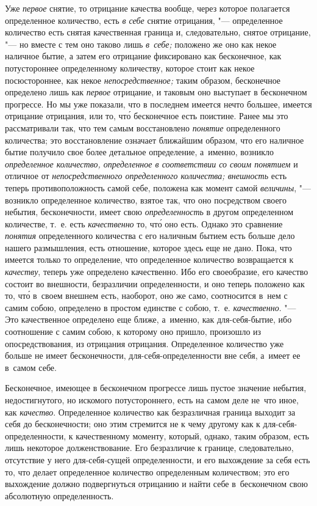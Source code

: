 Уже {\em первое} снятие, то отрицание качества вообще, через которое полагается
определенное количество, есть {\em в себе} снятие отрицания, "--- определенное
количество есть снятая качественная граница и, следовательно, снятое отрицание,
"--- но вместе с тем оно таково лишь {\em в~себе;} положено же оно как некое
наличное бытие, а затем его отрицание фиксировано как бесконечное, как
потустороннее определенному количеству, которое стоит как некое посюстороннее,
как некое {\em непосредственное;} таким образом, бесконечное определено лишь
как {\em первое} отрицание, и таковым оно выступает в бесконечном прогрессе.
Но мы уже показали, что в последнем имеется нечто большее, имеется отрицание
отрицания, или то, чт\'{о} бесконечное есть поистине. Ранее мы это
рассматривали так, что тем самым восстановлено {\em понятие} определенного
количества; это восстановление означает ближайшим образом, что его наличное
бытие получило свое более детальное определение, а~именно, возникло
{\em определенное количество, определенное в соответствии со своим понятием}
и отличное от {\em непосредственного определенного количества; внешность} есть
теперь противоположность самой себе, положена как момент самой {\em величины},
"--- возникло определенное количество, взятое так, что оно посредством своего
небытия, бесконечности, имеет свою {\em определенность} в другом определенном
количестве, т.~е. есть {\em качественно} то, чт\'{о} оно есть. Однако это
сравнение {\em понятия} определенного количества с его наличным бытием есть
больше дело нашего размышления, есть отношение, которое здесь еще не дано.
Пока, что имеется только то определение, что определенное количество
возвращается к {\em качеству}, теперь уже определено качественно. Ибо его
своеобразие, его качество состоит во внешности, безразличии определенности,
и оно теперь положено как то, чт\'{о} в~своем внешнем есть, наоборот, оно же
само, соотносится в~нем с самим собою, определено в простом единстве с собою,
т.~е. {\em качественно}. "--- Это качественное определено еще ближе, а~именно,
как для-себя-бытие, ибо соотношение с самим собою, к которому оно пришло,
произошло из опосредствования, из отрицания отрицания. Определенное количество
уже больше не имеет бесконечности, для-себя-определенности вне себя,
а~имеет ее в~самом себе.

Бесконечное, имеющее в бесконечном прогрессе лишь пустое значение небытия,
недостигнутого, но искомого потустороннего, есть на самом деле не~что иное,
как {\em качество}. Определенное количество как безразличная граница выходит
за себя до бесконечности; оно этим стремится не к чему другому как
к для-себя-определенности, к качественному моменту, который, однако, таким
образом, есть лишь некоторое долженствование. Его безразличие к границе,
следовательно, отсутствие у него для-себя-сущей определенности, и его
выхождение за себя есть то, что делает определенное количество определенным
количеством; это его выхождение должно подвергнуться отрицанию и найти
себе в~бесконечном свою абсолютную определенность.

